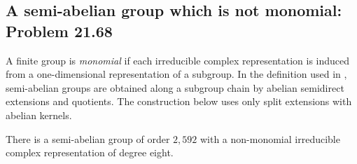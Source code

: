 \subsection{A semi-abelian group which is not monomial: Problem 21.68}
\label{subsec:semiabelian}

A finite group is \emph{monomial} if each irreducible complex
representation is induced from a one-dimensional representation of
a subgroup. In the definition used in , semi-abelian
groups are obtained along a subgroup chain by abelian semidirect
extensions and quotients. The construction below uses only split
extensions with abelian kernels.

\begin{theorem}
\label{thm:semiabelian}
There is a semi-abelian group of order $2,592$ with a non-monomial
irreducible complex representation of degree eight.
\end{theorem}

